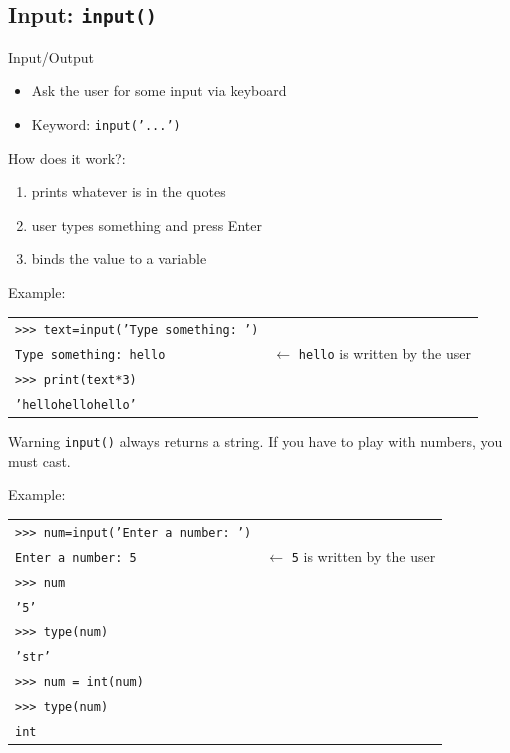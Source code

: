 \documentclass[t,handout,9pt]{beamer}
\begin{document}
\subsection{Input: \texttt{input()}}
\begin{frame}{Input/Output}
\vfill
\begin{itemize}
	\item Ask the user for some input via keyboard
	\item Keyword: \texttt{input('...')}
\end{itemize}
\vfill
How does it work?:
\begin{enumerate}
	\item prints whatever is in the quotes
	\item user types something and press Enter
	\item binds the value to a variable
\end{enumerate}
\vfill
Example:
\begin{table}[]
\begin{tabular}{ll}
\texttt{>{}>{}> text=input('Type something: ')} & \\
\texttt{Type something: hello} & $\leftarrow$ \texttt{hello} is written by the user\\
\texttt{>{}>{}> print(text*3)} & \\
\texttt{'hellohellohello'} & \\
\end{tabular}
\end{table}
\vfill
\end{frame}
%
\begin{frame}
\vfill
\begin{block}{Warning}
\texttt{input()} always returns a string. If you have to play with numbers, you must cast.
\end{block}
\vfill
Example:
\begin{table}[]
\begin{tabular}{ll}
\texttt{>{}>{}> num=input('Enter a number: ')} & \\
\texttt{Enter a number: 5} & $\leftarrow$ \texttt{5} is written by the user\\
\texttt{>{}>{}> num} & \\
\texttt{'5'} & \\
\texttt{>{}>{}> type(num)} & \\
\texttt{'str'} & \\
\texttt{>{}>{}> num = int(num)} & \\
\texttt{>{}>{}> type(num)} & \\
\texttt{int} & \\
\end{tabular}
\end{table}
\vfill
\end{frame}
\end{document}
